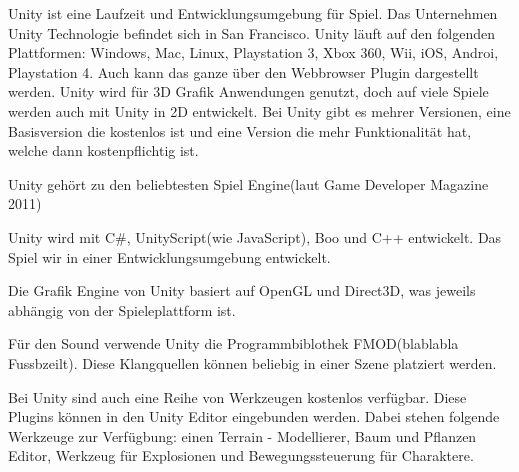 Unity ist eine Laufzeit und Entwicklungsumgebung für Spiel. Das Unternehmen Unity Technologie befindet sich in San Francisco.
Unity läuft auf den folgenden Plattformen: Windows, Mac, Linux, Playstation 3, Xbox 360, Wii, iOS, Androi, Playstation 4. Auch kann das ganze über den Webbrowser Plugin dargestellt werden.
Unity wird für 3D Grafik Anwendungen genutzt, doch auf viele Spiele werden auch mit Unity in 2D entwickelt.
Bei Unity gibt es mehrer Versionen, eine Basisversion die kostenlos ist und eine Version die mehr Funktionalität hat, welche dann kostenpflichtig ist. 

Unity gehört zu den beliebtesten Spiel Engine(laut Game Developer Magazine 2011)

Unity wird mit C\#, UnityScript(wie JavaScript), Boo und C++ entwickelt.
Das Spiel wir in einer Entwicklungsumgebung entwickelt. 

Die Grafik Engine von Unity basiert auf OpenGL und Direct3D, was jeweils abhängig von der Spieleplattform ist. 

Für den Sound verwende Unity die Programmbiblothek FMOD(blablabla Fussbzeilt). Diese Klangquellen können beliebig in einer Szene platziert werden. 

Bei Unity sind auch eine Reihe von Werkzeugen kostenlos verfügbar.
Diese Plugins können in den Unity Editor eingebunden werden. 
Dabei stehen folgende Werkzeuge zur Verfügbung: einen Terrain - Modellierer, Baum und Pflanzen Editor, Werkzeug für Explosionen und Bewegungssteuerung für Charaktere.